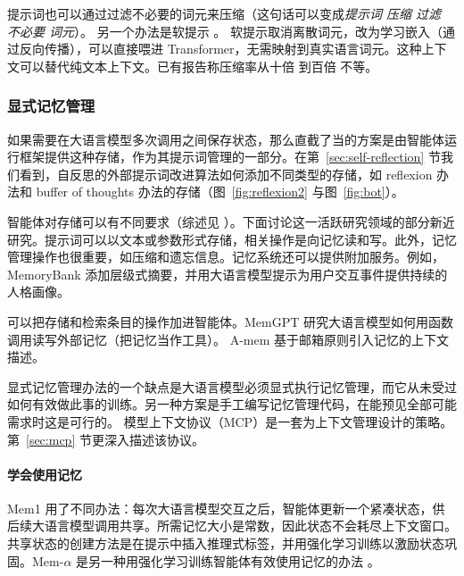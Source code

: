 提示词也可以通过过滤不必要的词元来压缩（这句话可以变成{\em 提示词 压缩 过滤 不必要 词元}）。
%
另一个办法是软提示 \citep{lester2021power}。
%
软提示取消离散词元，改为学习嵌入（通过反向传播），可以直接喂进 Transformer，无需映射到真实语言词元。这种上下文可以替代纯文本上下文。已有报告称压缩率从十倍 \citep{mu2023learning} 到百倍 \citep{li2025500xcompressor} 不等。




\subsubsection{显式记忆管理}
如果需要在大语言模型多次调用之间保存状态，那么直截了当的方案是由智能体运行框架提供这种存储，作为其提示词管理的一部分。在第~\ref{sec:self-reflection} 节我们看到，自反思的外部提示词改进算法如何添加不同类型的存储，如 reflexion 办法和 buffer of thoughts 办法的存储（图~\ref{fig:reflexion2} 与图~\ref{fig:bot}）。

智能体对存储可以有不同要求（综述见 \citet{zhang2025survey,chhikara2025mem0}）。下面讨论这一活跃研究领域的部分新近研究。提示词可以以文本或参数形式存储，相关操作是向记忆读和写。此外，记忆管理操作也很重要，如压缩和遗忘信息。记忆系统还可以提供附加服务。例如，MemoryBank \citep{zhong2024memorybank} 添加层级式摘要，并用大语言模型提示为用户交互事件提供持续的人格画像。

可以把存储和检索条目的操作加进智能体。MemGPT \citep{packer2023memgpt} 研究大语言模型如何用函数调用读写外部记忆（把记忆当作工具）。%
A-mem \citep{xu2025mem} 基于邮箱原则引入记忆的上下文描述。

显式记忆管理办法的一个缺点是大语言模型必须显式执行记忆管理，而它从未受过如何有效做此事的训练。另一种方案是手工编写记忆管理代码，在能预见全部可能需求时这是可行的。
模型上下文协议（MCP）是一套为上下文管理设计的策略。第~\ref{sec:mcp} 节更深入描述该协议。


\paragraph{学会使用记忆}
Mem1 \citep{zhou2025mem1} 用了不同办法：每次大语言模型交互之后，智能体更新一个紧凑状态，供后续大语言模型调用共享。所需记忆大小是常数，因此状态不会耗尽上下文窗口。共享状态的创建方法是在提示中插入推理式标签，并用强化学习训练以激励状态巩固。Mem-$\alpha$ 是另一种用强化学习训练智能体有效使用记忆的办法 \citep{wang2025mem}。

